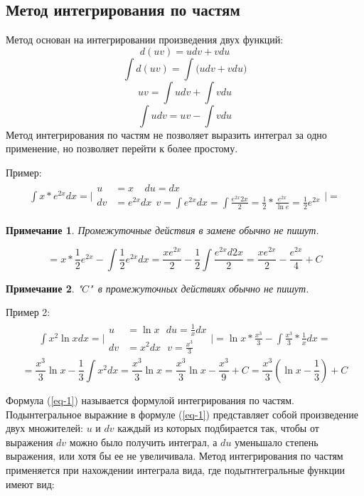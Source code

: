 \documentclass[12pt,a4paper]{article}
\newtheorem*{remark}{Примечание}
\begin{document}
\subsection{Метод интегрирования по частям}
Метод основан на интегрировании произведения двух функций:
\[
    d(uv) = udv + vdu
\]
\[
\int d(uv) = \int \big( udv + vdu \big)
\]
\[
uv = \int udv + \int vdu
\]
\begin{equation} \label{eq-1}
\int udv = uv - \int vdu
\end{equation}
Метод интегрирования по частям не позволяет выразить интеграл за
одно применение, но позволяет перейти к более простому.

Пример:
\begin{align*}
\int x * e^{2x} dx = \Bigg|
\begin{split}
u & = x\ \ \ \ \ du = dx \\
dv & = e^{2x} dx \ \ v = \int e^{2x} dx =
\int \frac{e^{2x} 2x}{2} = \frac{1}{2} * \frac{e^{2x}}{ \ln e} =
\frac{1}{2}e^{2x}
\end{split}
\Bigg| =
\end{align*}
\begin{remark}
Промежуточные действия в замене обычно не пишут.
\end{remark}
\[
= x * \frac{1}{2} e^{2x} - \int \frac{1}{2} e^{2x} dx =
\frac{x e^{2x}}{2} - \frac{1}{2} \int \frac{e^{2x} d2x}{2} =
\frac{xe^{2x}}{2} - \frac{e^{2x}}{4} + C
\]
\begin{remark}
"$C$"\ в промежуточных действиях обычно не пишут.
\end{remark}

Пример 2:
\begin{align*}
\int x^2 \ln x dx = \Bigg|
\begin{split}
u & = \ln x \ \ \ du = \frac{1}{x}dx\\
dv & = x^2 dx \ \ \ v = \frac{x^3}{3}
\end{split}
\Bigg| =
\ln x * \frac{x^3}{3} - \int \frac{x^3}{3} * \frac{1}{x} dx =
\end{align*}
\[
= \frac{x^3}{3} \ln x - \frac{1}{3} \int x^2 dx = \frac{x^3}{3} \ln x
= \frac{x^3}{3} \ln x - \frac{x^3}{9} + C = \frac{x^3}{3}
(\ln x - \frac{1}{3}) + C
\]

Формула (\ref{eq-1}) называется формулой интегрирования по частям.
Подынтегральное выражние в формуле (\ref{eq-1}) представляет собой
произведение двух множителей: $u$ и $dv$ каждый из которых
подбирается так, чтобы от выражения $dv$ можно было получить
интеграл, а $du$ уменьшало степень выражения, или хотя бы ее не
увеличивала.
Метод интегрирования по частям применяется при нахождении интеграла
вида, где подытнтегральные функции имеют вид:
\end{document}
